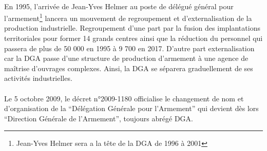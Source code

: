 \documentclass[11pt, book, english, french]{upmethodology-document}
\begin{document}
				\paragraph*{}
					En 1995, l’arrivée de Jean-Yves Helmer au poste de délégué général pour l'armement\footnote{Jean-Yves Helmer sera a la tête de la DGA de 1996 à 2001} lancera un mouvement de regroupement et d'externalisation de la production industrielle. Regroupement d'une part par la fusion des implantations territoriales pour former 14 grands centres ainsi que la réduction du personnel qui passera de plus de 50 000 en 1995 à 9 700 en 2017. D’autre part externalisation car la DGA passe d’une structure de production d’armement à une agence de maîtrise d’ouvrages complexes. Ainsi, la DGA se séparera graduellement de ses activités industrielles.
				\paragraph*{}
					Le 5 octobre 2009, le décret n°2009-1180\cite{DEFD0918712D} officialise le changement de nom et d'organisation de la ``Délégation Générale pour l'Armement'' qui devient dès lors ``Direction Générale de l'Armement'', toujours abrégé DGA.
\end{document}
